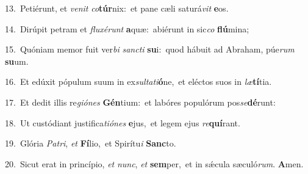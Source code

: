 {\numbfont\textcolor{\numbcolor}{13.}}~Petiérunt, et \textit{ve}\-\textit{nit} \textit{co}\-\textbf{túr}nix:~\star et pane cæli saturá\textit{vit} \textbf{e}\-os.\par
{\numbfont\textcolor{\numbcolor}{14.}}~Dirúpit petram et \textit{flu}\-\textit{xé}\textit{runt} \textbf{a}\-quæ:~\star abiérunt in sic\textit{co} \textbf{flú}\-mina;\par
{\numbfont\textcolor{\numbcolor}{15.}}~Quóniam memor fuit ver\textit{bi} \textit{sanc}\-\textit{ti} \textbf{su}\-i:~\star quod hábuit ad Abraham, púe\textit{rum} \textbf{su}\-um.\par
{\numbfont\textcolor{\numbcolor}{16.}}~Et edúxit pópulum suum in ex\-\textit{sul}\-\textit{ta}\textit{ti}\textbf{ó}ne,~\star et eléctos suos in \textit{læ}\-\textbf{tí}tia.\par
{\numbfont\textcolor{\numbcolor}{17.}}~Et dedit illis re\-\textit{gi}\-\textit{ó}\textit{nes} \textbf{Gén}\-tium:~\star et labóres populórum pos\-\textit{se}\-\textbf{dé}runt:\par
{\numbfont\textcolor{\numbcolor}{18.}}~Ut custódiant justifica\-\textit{ti}\-\textit{ó}\textit{nes} \textbf{e}\-jus,~\star et legem ejus \textit{re}\-\textbf{quí}rant.\par
{\numbfont\textcolor{\numbcolor}{19.}}~Glória \textit{Pa}\-\textit{tri}, \textit{et} \textbf{Fí}\-lio,~\star et Spirítu\textit{i} \textbf{Sanc}\-to.\par
{\numbfont\textcolor{\numbcolor}{20.}}~Sicut erat in princípio, \textit{et} \textit{nunc}\-, \textit{et} \textbf{sem}\-per,~\star et in sǽcula sæculó\-\textit{rum}\-. \textbf{A}\-men.\par

